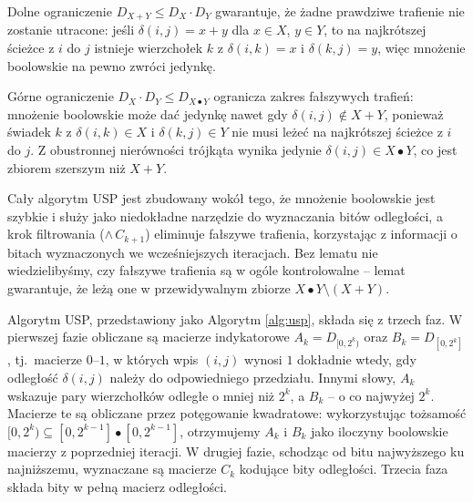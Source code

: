 Dolne ograniczenie $D_{X+Y} \leq D_X \cdot D_Y$
gwarantuje, że żadne prawdziwe trafienie nie zostanie utracone:
jeśli $\delta(i,j) = x + y$ dla $x \in X$, $y \in Y$, to na najkrótszej
ścieżce z $i$ do $j$ istnieje wierzchołek $k$ z $\delta(i,k) = x$
i $\delta(k,j) = y$, więc mnożenie boolowskie na pewno zwróci jedynkę.

Górne ograniczenie $D_X \cdot D_Y \leq D_{X \bullet Y}$
ogranicza zakres fałszywych trafień: mnożenie boolowskie może
dać jedynkę nawet gdy $\delta(i,j) \notin X + Y$, ponieważ świadek $k$
z $\delta(i,k) \in X$ i $\delta(k,j) \in Y$ nie musi leżeć na
najkrótszej ścieżce z $i$ do $j$. Z obustronnej nierówności trójkąta
wynika jedynie $\delta(i,j) \in X \bullet Y$, co jest zbiorem szerszym
niż $X + Y$.

Cały algorytm USP jest zbudowany wokół tego, że mnożenie boolowskie jest szybkie i służy jako niedokładne narzędzie do wyznaczania bitów
odległości, a krok filtrowania ($\wedge\, C_{k+1}$) eliminuje fałszywe
trafienia, korzystając z informacji o bitach
wyznaczonych we wcześniejszych iteracjach. Bez lematu nie
wiedzielibyśmy, czy fałszywe trafienia są w ogóle kontrolowalne --
lemat gwarantuje, że leżą one w przewidywalnym zbiorze
$X \bullet Y \setminus (X + Y)$.

Algorytm USP, przedstawiony jako Algorytm \ref{alg:usp}, składa się z trzech faz. W pierwszej fazie obliczane są macierze indykatorowe $A_k = D_{[0, 2^k)}$ oraz $B_k = D_{[0, 2^k]}$, tj.\ macierze $0$--$1$, w których wpis $(i,j)$ wynosi $1$ dokładnie wtedy, gdy odległość $\delta(i,j)$ należy do odpowiedniego przedziału. Innymi słowy, $A_k$ wskazuje pary wierzchołków odległe o mniej niż $2^k$, a $B_k$ -- o co najwyżej $2^k$. Macierze te są obliczane przez potęgowanie kwadratowe: wykorzystując tożsamość $[0, 2^{k}) \subseteq [0, 2^{k-1}] \bullet [0, 2^{k-1}]$, otrzymujemy $A_k$ i $B_k$ jako iloczyny boolowskie macierzy z poprzedniej iteracji. W drugiej fazie, schodząc od bitu najwyższego ku najniższemu, wyznaczane są macierze $C_k$ kodujące bity odległości. Trzecia faza składa bity w pełną macierz odległości.


